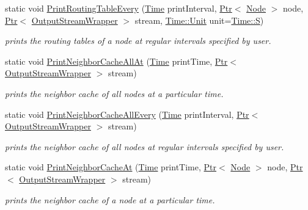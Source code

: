 \begin{DoxyCompactItemize}
static void \hyperlink{classns3_1_1Ipv6RoutingHelper_a802767089cd111e52aea8fef65dfd32e}{Print\+Routing\+Table\+Every} (\hyperlink{classns3_1_1Time}{Time} print\+Interval, \hyperlink{classns3_1_1Ptr}{Ptr}$<$ \hyperlink{classns3_1_1Node}{Node} $>$ node, \hyperlink{classns3_1_1Ptr}{Ptr}$<$ \hyperlink{classns3_1_1OutputStreamWrapper}{Output\+Stream\+Wrapper} $>$ stream, \hyperlink{classns3_1_1Time_a87a7f4d29c68b047a72d291ad660295a}{Time\+::\+Unit} unit=\hyperlink{classns3_1_1Time_a87a7f4d29c68b047a72d291ad660295aade8622b06524a328cd3a59db6ccf76af}{Time\+::S})
\begin{DoxyCompactList}\small\item\em prints the routing tables of a node at regular intervals specified by user. \end{DoxyCompactList}\item 
static void \hyperlink{classns3_1_1Ipv6RoutingHelper_a3fb619b1828a73f8c4a77ba1a64c6417}{Print\+Neighbor\+Cache\+All\+At} (\hyperlink{classns3_1_1Time}{Time} print\+Time, \hyperlink{classns3_1_1Ptr}{Ptr}$<$ \hyperlink{classns3_1_1OutputStreamWrapper}{Output\+Stream\+Wrapper} $>$ stream)
\begin{DoxyCompactList}\small\item\em prints the neighbor cache of all nodes at a particular time. \end{DoxyCompactList}\item 
static void \hyperlink{classns3_1_1Ipv6RoutingHelper_a623d584ad005d7b9f5c6d43b34007243}{Print\+Neighbor\+Cache\+All\+Every} (\hyperlink{classns3_1_1Time}{Time} print\+Interval, \hyperlink{classns3_1_1Ptr}{Ptr}$<$ \hyperlink{classns3_1_1OutputStreamWrapper}{Output\+Stream\+Wrapper} $>$ stream)
\begin{DoxyCompactList}\small\item\em prints the neighbor cache of all nodes at regular intervals specified by user. \end{DoxyCompactList}\item 
static void \hyperlink{classns3_1_1Ipv6RoutingHelper_a8906443d390d97c41fdb09df227051aa}{Print\+Neighbor\+Cache\+At} (\hyperlink{classns3_1_1Time}{Time} print\+Time, \hyperlink{classns3_1_1Ptr}{Ptr}$<$ \hyperlink{classns3_1_1Node}{Node} $>$ node, \hyperlink{classns3_1_1Ptr}{Ptr}$<$ \hyperlink{classns3_1_1OutputStreamWrapper}{Output\+Stream\+Wrapper} $>$ stream)
\begin{DoxyCompactList}\small\item\em prints the neighbor cache of a node at a particular time. \end{DoxyCompactList}\item 

\end{DoxyCompactItemize}

